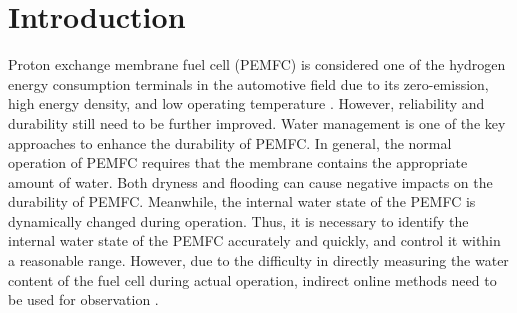 \section{Introduction}
Proton exchange membrane fuel cell (PEMFC) is considered one of the hydrogen energy consumption terminals in the automotive field due to its zero-emission, high energy density, and low operating temperature \cite{zhuHighprecisionIdentificationPolarization2022,maResearchElectrochemicalImpedance2021}. However, reliability and durability still need to be further improved\cite{haslamAssessingFuelCell2012}. Water management is one of the key approaches to enhance the durability of PEMFC. In general, the normal operation of PEMFC requires that the membrane contains the appropriate amount of water. Both dryness and flooding can cause negative impacts on the durability of PEMFC\cite{yangInplaneTransportEffects2012,owejanVoltageInstabilitySimulated2007,endohDegradationStudyMEA2004,kadykNonlinearFrequencyResponse2012}. Meanwhile, the internal water state of the PEMFC is dynamically changed during operation. Thus, it is necessary to identify the internal water state of the PEMFC accurately and quickly, and control it within a reasonable range. However, due to the difficulty in directly measuring the water content of the fuel cell during actual operation, indirect online methods need to be used for observation \cite{damourPolymerElectrolyteMembrane2015,shinOnlineWaterContents2020}.
\par

